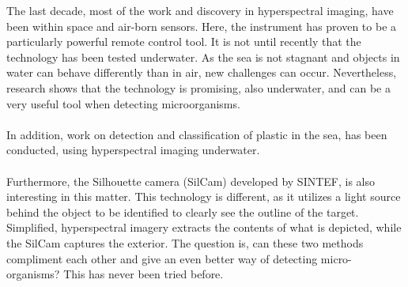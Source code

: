 The last decade, most of the work and discovery in hyperspectral imaging, have been within space and air-born sensors. Here, the instrument has proven to be a particularly powerful remote control tool. It is not until recently that the technology has been tested underwater. As the sea is not stagnant and objects in water can behave differently than in air, new challenges can occur. Nevertheless, research shows that the technology is promising, also underwater, and can be a very useful tool when detecting microorganisms.
\\\\
In addition, work on detection and classification of plastic in the sea, has been conducted, using hyperspectral imaging underwater. 
\\\\
Furthermore, the Silhouette camera (SilCam) developed by SINTEF, is also interesting in this matter. This technology is different, as it utilizes a light source behind the object to be identified to clearly see the outline of the target. Simplified, hyperspectral imagery extracts the contents of what is depicted, while the SilCam captures the exterior. The question is, can these two methods compliment each other and give an even better way of detecting micro-organisms? This has never been tried before.